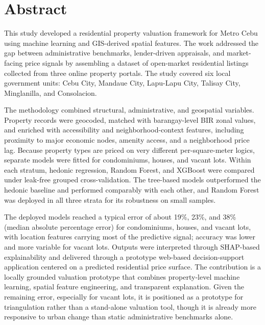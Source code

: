 \clearpage
\section*{Abstract}

This study developed a residential property valuation framework for Metro Cebu using machine learning and GIS-derived spatial features. The work addressed the gap between administrative benchmarks, lender-driven appraisals, and market-facing price signals by assembling a dataset of open-market residential listings collected from three online property portals. The study covered six local government units: Cebu City, Mandaue City, Lapu-Lapu City, Talisay City, Minglanilla, and Consolacion.

The methodology combined structural, administrative, and geospatial variables. Property records were geocoded, matched with barangay-level BIR zonal values, and enriched with accessibility and neighborhood-context features, including proximity to major economic nodes, amenity access, and a neighborhood price lag. Because property types are priced on very different per-square-meter logics, separate models were fitted for condominiums, houses, and vacant lots. Within each stratum, hedonic regression, Random Forest, and XGBoost were compared under leak-free grouped cross-validation. The tree-based models outperformed the hedonic baseline and performed comparably with each other, and Random Forest was deployed in all three strata for its robustness on small samples.

The deployed models reached a typical error of about 19\%, 23\%, and 38\% (median absolute percentage error) for condominiums, houses, and vacant lots, with location features carrying most of the predictive signal; accuracy was lower and more variable for vacant lots. Outputs were interpreted through SHAP-based explainability and delivered through a prototype web-based decision-support application centered on a predicted residential price surface. The contribution is a locally grounded valuation prototype that combines property-level machine learning, spatial feature engineering, and transparent explanation. Given the remaining error, especially for vacant lots, it is positioned as a prototype for triangulation rather than a stand-alone valuation tool, though it is already more responsive to urban change than static administrative benchmarks alone.
